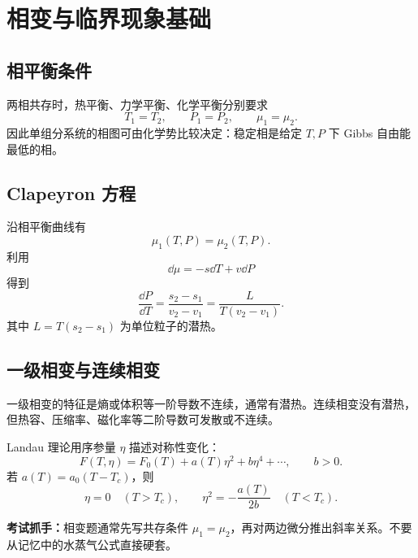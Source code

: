 \chapter{相变与临界现象基础}

\section{相平衡条件}

两相共存时，热平衡、力学平衡、化学平衡分别要求
\[
  T_1=T_2,\qquad P_1=P_2,\qquad \mu_1=\mu_2.
\]
因此单组分系统的相图可由化学势比较决定：稳定相是给定 $T,P$ 下 Gibbs 自由能最低的相。

\section{Clapeyron 方程}

沿相平衡曲线有
\[
  \mu_1(T,P)=\mu_2(T,P).
\]
利用
\[
  \dd\mu=-s\dd T+v\dd P
\]
得到
\[
  \frac{\dd P}{\dd T}=\frac{s_2-s_1}{v_2-v_1}
  =\frac{L}{T(v_2-v_1)}.
\]
其中 $L=T(s_2-s_1)$ 为单位粒子的潜热。

\section{一级相变与连续相变}

一级相变的特征是熵或体积等一阶导数不连续，通常有潜热。连续相变没有潜热，但热容、压缩率、磁化率等二阶导数可发散或不连续。

Landau 理论用序参量 $\eta$ 描述对称性变化：
\[
  F(T,\eta)=F_0(T)+a(T)\eta^2+b\eta^4+\cdots,\qquad b>0.
\]
若 $a(T)=a_0(T-T_c)$，则
\[
  \eta=0\quad (T>T_c),\qquad
  \eta^2=-\frac{a(T)}{2b}\quad (T<T_c).
\]

\begin{keybox}
\textbf{考试抓手：}相变题通常先写共存条件 $\mu_1=\mu_2$，再对两边微分推出斜率关系。不要从记忆中的水蒸气公式直接硬套。
\end{keybox}

